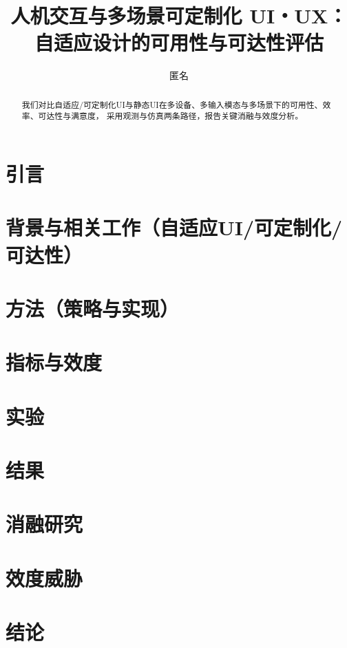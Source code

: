 \documentclass[UTF8]{ctexart}
\title{人机交互与多场景可定制化 UI・UX：自适应设计的可用性与可达性评估}
\author{匿名}
\date{}
\begin{document}
\maketitle

\begin{abstract}
我们对比自适应/可定制化UI与静态UI在多设备、多输入模态与多场景下的可用性、效率、可达性与满意度，
采用观测与仿真两条路径，报告关键消融与效度分析。
\end{abstract}

\section{引言}
\section{背景与相关工作（自适应UI/可定制化/可达性）}
\section{方法（策略与实现）}
\section{指标与效度}
\section{实验}
\section{结果}
\section{消融研究}
\section{效度威胁}
\section{结论}



\end{document}
